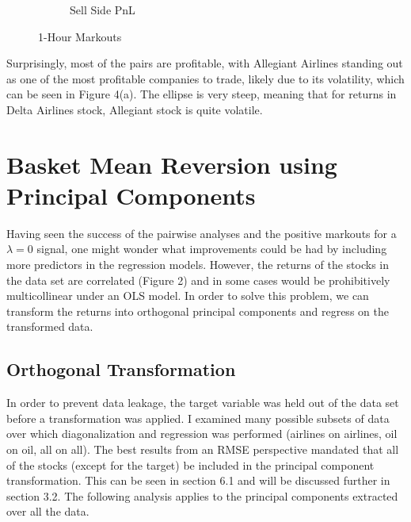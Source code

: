 \documentclass{article}
\begin{document}
\begin{figure}[h!]
\begin{subfigure}{.5\textwidth}
    \caption{Sell Side PnL}
  \end{subfigure}
  \caption{1-Hour Markouts}
\end{figure}
Surprisingly, most of the pairs are profitable, with Allegiant Airlines standing out 
as one of the most profitable companies to trade, likely due to its volatility, which
can be seen in Figure 4(a). The ellipse is very steep, meaning that for
returns in Delta Airlines stock, Allegiant stock is quite volatile.

\section{Basket Mean Reversion using Principal Components}
Having seen the success of the pairwise analyses and the positive markouts for 
a $\lambda=0$ signal, one might wonder what improvements could be had by including
more predictors in the regression models. However, the returns of the stocks in the 
data set are correlated (Figure 2) and in some cases would be prohibitively multicollinear under
an OLS model. In order to solve this problem, we can transform the returns into
orthogonal principal components and regress on the transformed data. 

\subsection{Orthogonal Transformation}
In order to prevent data leakage, the target variable was held out of the data set before 
a transformation was applied. I examined many possible subsets of data over which 
diagonalization and regression was performed (airlines on airlines, oil on oil, all on all).
The best results from an RMSE perspective mandated that all of the stocks (except for the 
target) be included in the principal component transformation. This can be seen in section
6.1 and will be discussed further in section 3.2. The following analysis applies
to the principal components extracted over all the data. 
\end{document}
